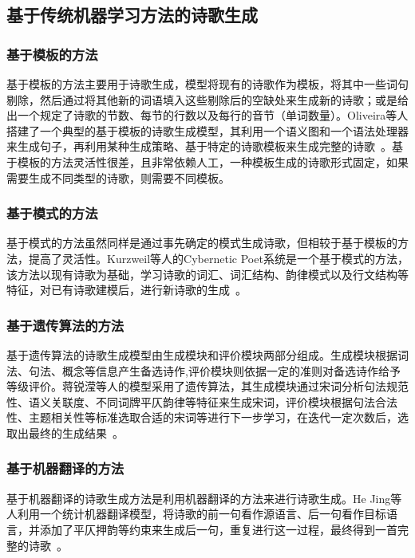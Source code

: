 \subsection{基于传统机器学习方法的诗歌生成}

\subsubsection{基于模板的方法}
基于模板的方法主要用于诗歌生成，模型将现有的诗歌作为模板，将其中一些词句剔除，然后通过将其他新的词语填入这些剔除后的空缺处来生成新的诗歌；或是给出一个规定了诗歌的节数、每节的行数以及每行的音节（单词数量）。Oliveira等人搭建了一个典型的基于模板的诗歌生成模型，其利用一个语义图和一个语法处理器来生成句子，再利用某种生成策略、基于特定的诗歌模板来生成完整的诗歌~\autocite{oliveira2012poetryme}。基于模板的方法灵活性很差，且非常依赖人工，一种模板生成的诗歌形式固定，如果需要生成不同类型的诗歌，则需要不同模板。\par

\subsubsection{基于模式的方法}
基于模式的方法虽然同样是通过事先确定的模式生成诗歌，但相较于基于模板的方法，提高了灵活性。Kurzweil等人的Cybernetic Poet系统是一个基于模式的方法，该方法以现有诗歌为基础，学习诗歌的词汇、词汇结构、韵律模式以及行文结构等特征，对已有诗歌建模后，进行新诗歌的生成~\autocite{kurzweil2001ray}。\par

\subsubsection{基于遗传算法的方法}
基于遗传算法的诗歌生成模型由生成模块和评价模块两部分组成。生成模块根据词法、句法、概念等信息产生备选诗作,评价模块则依据一定的准则对备选诗作给予等级评价。蒋锐滢等人的模型采用了遗传算法，其生成模块通过宋词分析句法规范性、语义关联度、不同词牌平仄韵律等特征来生成宋词，评价模块根据句法合法性、主题相关性等标准选取合适的宋词等进行下一步学习，在迭代一定次数后，选取出最终的生成结果~\autocite{jiang2015jiyu}。\par

\subsubsection{基于机器翻译的方法}
基于机器翻译的诗歌生成方法是利用机器翻译的方法来进行诗歌生成。He Jing等人利用一个统计机器翻译模型，将诗歌的前一句看作源语言、后一句看作目标语言，并添加了平仄押韵等约束来生成后一句，重复进行这一过程，最终得到一首完整的诗歌~\autocite{he2012generating}。\par

